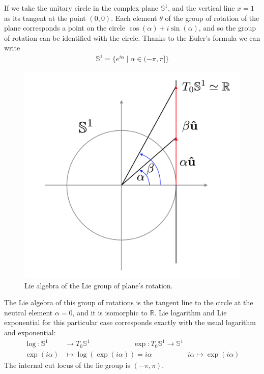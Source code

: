 \begin{example}
	If we take the unitary circle in the complex plane $\mathbb{S}^{1}$, and the vertical line $x = 1$ as its tangent at the point $(0,0)$. Each element $\theta$ of the group of rotation of the plane corresponds a point on the circle $\cos(\alpha)+ i\sin(\alpha)$, and so the group of rotation can be identified with the circle. Thanks to the Euler's formula we can write
	\begin{align*}
	\mathbb{S}^{1} = \{e^{i\alpha}  \mid \alpha \in (-\pi,\pi] \}
	\end{align*}
	\begin{figure}[!ht]
		\centering
		\includegraphics[scale=0.35]{figures/circle_example.png}
		\caption{Lie algebra of the Lie group of plane's rotation.}
		\label{fig:evolution}
	\end{figure}  
	The Lie algebra of this group of rotations is the tangent line to the circle at the neutral element $\alpha = 0$, and it is isomorphic to $\mathbb{R}$. Lie logarithm and Lie exponential for this particular case corresponds exactly with the usual logarithm and exponential:
	\begin{align*}
	\log : \mathbb{S}^{1} & \longrightarrow T_{0} \mathbb{S}^{1} 
	\qquad \qquad \quad \quad 
	\exp : T_{0} \mathbb{S}^{1}  \longrightarrow \mathbb{S}^{1}
	\\
	\exp{(i\alpha)} &\longmapsto \log(\exp{(i\alpha)})  =  i\alpha 
	\qquad \qquad \quad   
	i\alpha \longmapsto \exp(i\alpha)  
	\end{align*}
	The internal cut locus of the lie group is $(-\pi, \pi)$.
\end{example}

